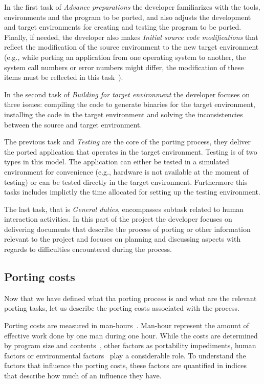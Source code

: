 In the first task of \textit{Advance preparations} the developer 
familiarizes with the tools, environments and the program to be ported, and 
also adjusts the development and target environments for creating and testing the
program to be ported. Finally, if needed, the developer also makes
\textit{Initial source code modifications} that reflect the modification of
the source environment to the new target environment (e.g., while porting an
application from one operating system to another, the system call numbers or
error numbers might differ, the modification of these items must be reflected
in this task~\cite{b22}).

In the second task of \textit{Building for target environment} the developer
focuses on three issues: compiling the code to generate binaries for the
target environment, installing the code in the target environment and solving
the inconsistencies between the source and target environment.

The previous task and \textit{Testing} are the core of the porting process, they
deliver the ported application that operates in the target environment.
Testing is of two types in this model. The application can either be tested in a
simulated environment for convenience (e.g., hardware is not available at the
moment of testing) or can be tested directly in the target environment.
Furthermore this tasks includes implictly the time allocated for setting up the
testing environment. 

The last task, that is \textit{General duties}, encompasses subtask related to
human interaction activities. In this part of the project the developer focuses
on delivering documents that describe the process of porting or other
information relevant to the project and focuses on planning and discussing
aspects with regards to difficulties encountered during the process.

\subsection{Porting costs}

Now that we have defined what tha porting process is and what are the relevant
porting tasks, let us describe the porting costs associated with the process.

Porting costs are measured in man-hours~\cite{b1, b2}. Man-hour represent the
amount of effective work done by one man during one hour. While the costs are
determined by program size and contents~\cite{b2}, other factors as portability
impediments, human factors or environmental factors~\cite{b2} play a
considerable role. To understand the factors that influence the porting costs,
these factors are quantified in indices that describe how much of an influence
they have.

